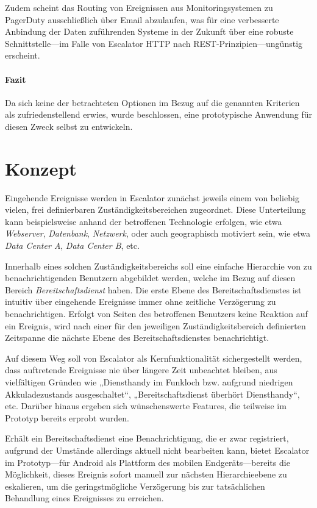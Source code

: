 \documentclass[11pt,utf8,notoc,bibnum,german,final]{zihpub}
\begin{document}
Zudem scheint das Routing von Ereignissen aus Monitoringsystemen zu PagerDuty
ausschließlich über Email abzulaufen, was für eine verbesserte Anbindung der
Daten zuführenden Systeme in der Zukunft über eine robuste Schnittstelle—im
Falle von Escalator HTTP nach REST-Prinzipien—ungünstig erscheint.

\paragraph{Fazit}

Da sich keine der betrachteten Optionen im Bezug auf die genannten Kriterien
als zufriedenstellend erwies, wurde beschlossen, eine prototypische Anwendung
für diesen Zweck selbst zu entwickeln.

\section{Konzept}
\label{concept}

Eingehende Ereignisse werden in Escalator zunächst jeweils einem von
beliebig vielen, frei definierbaren Zuständigkeitsbereichen zugeordnet. Diese
Unterteilung kann beispielsweise anhand der betroffenen Technologie erfolgen,
wie etwa \emph{Webserver}, \emph{Datenbank}, \emph{Netzwerk}, oder auch
geographisch motiviert sein, wie etwa \emph{Data Center A}, \emph{Data Center
B}, etc.

Innerhalb eines solchen Zuständigkeitsbereichs soll eine einfache Hierarchie
von zu benachrichtigenden Benutzern abgebildet werden, welche im Bezug auf
diesen Bereich \emph{Bereitschaftsdienst} haben. Die erste Ebene des
Bereitschaftsdienstes ist intuitiv über eingehende Ereignisse immer ohne
zeitliche Verzögerung zu benachrichtigen. Erfolgt von Seiten des betroffenen
Benutzers keine Reaktion auf ein Ereignis, wird nach einer für den jeweiligen
Zuständigkeitsbereich definierten Zeitspanne die nächste Ebene des
Bereitschaftsdienstes benachrichtigt.

Auf diesem Weg soll von Escalator als Kernfunktionalität sichergestellt werden,
dass auftretende Ereignisse nie über längere Zeit unbeachtet bleiben, aus
vielfältigen Gründen wie „Diensthandy im Funkloch bzw. aufgrund niedrigen
Akkuladezustands ausgeschaltet“, „Bereitschaftsdienst überhört Diensthandy“,
etc. Darüber hinaus ergeben sich wünschenswerte Features, die teilweise im
Prototyp bereits erprobt wurden.

Erhält ein Bereitschaftsdienst eine Benachrichtigung, die er zwar registriert,
aufgrund der Umstände allerdings aktuell nicht bearbeiten kann, bietet
Escalator im Prototyp—für Android als Plattform des mobilen Endgeräts—bereits
die Möglichkeit, dieses Ereignis sofort manuell zur nächsten Hierarchieebene zu
eskalieren, um die geringstmögliche Verzögerung bis zur tatsächlichen
Behandlung eines Ereignisses zu erreichen.
\end{document}

